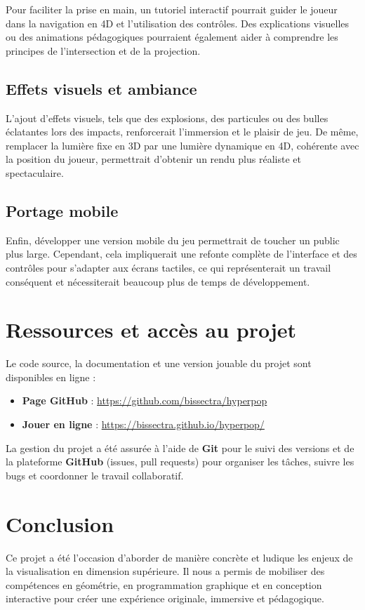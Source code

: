 \documentclass[11pt,a4paper]{article}
\begin{document}
Pour faciliter la prise en main, un tutoriel interactif pourrait guider le joueur dans la navigation en 4D et l’utilisation des contrôles. Des explications visuelles ou des animations pédagogiques pourraient également aider à comprendre les principes de l’intersection et de la projection.

\subsection{Effets visuels et ambiance}

L’ajout d’effets visuels, tels que des explosions, des particules ou des bulles éclatantes lors des impacts, renforcerait l’immersion et le plaisir de jeu. De même, remplacer la lumière fixe en 3D par une lumière dynamique en 4D, cohérente avec la position du joueur, permettrait d’obtenir un rendu plus réaliste et spectaculaire.

\subsection{Portage mobile}

Enfin, développer une version mobile du jeu permettrait de toucher un public plus large. Cependant, cela impliquerait une refonte complète de l’interface et des contrôles pour s’adapter aux écrans tactiles, ce qui représenterait un travail conséquent et nécessiterait beaucoup plus de temps de développement.

\section{Ressources et accès au projet}

Le code source, la documentation et une version jouable du projet sont disponibles en ligne :
\begin{itemize}
    \item \textbf{Page GitHub} : \url{https://github.com/bissectra/hyperpop}
    \item \textbf{Jouer en ligne} : \url{https://bissectra.github.io/hyperpop/}
\end{itemize}

La gestion du projet a été assurée à l'aide de \textbf{Git} pour le suivi des versions et de la plateforme \textbf{GitHub} (issues, pull requests) pour organiser les tâches, suivre les bugs et coordonner le travail collaboratif.

\section{Conclusion}

Ce projet a été l’occasion d’aborder de manière concrète et ludique les enjeux de la visualisation en dimension supérieure. Il nous a permis de mobiliser des compétences en géométrie, en programmation graphique et en conception interactive pour créer une expérience originale, immersive et pédagogique.
\end{document}
